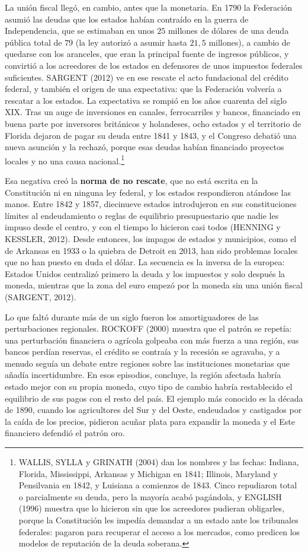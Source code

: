 \documentclass[10pt,a4paper]{article}
\begin{document}
La unión fiscal llegó, en cambio, antes que la monetaria. En 1790 la Federación asumió las deudas que los estados habían contraído en la guerra de Independencia, que se estimaban en unos $25$ millones de dólares de una deuda pública total de $79$ (la ley autorizó a asumir hasta $21{,}5$ millones), a cambio de quedarse con los aranceles, que eran la principal fuente de ingresos públicos, y convirtió a los acreedores de los estados en defensores de unos impuestos federales suficientes. SARGENT (2012) ve en ese rescate el acto fundacional del crédito federal, y también el origen de una expectativa: que la Federación volvería a rescatar a los estados. La expectativa se rompió en los años cuarenta del siglo XIX. Tras un auge de inversiones en canales, ferrocarriles y bancos, financiado en buena parte por inversores británicos y holandeses, ocho estados y el territorio de Florida dejaron de pagar su deuda entre 1841 y 1843, y el Congreso debatió una nueva asunción y la rechazó, porque esas deudas habían financiado proyectos locales y no una causa nacional.\footnote{%
    WALLIS, SYLLA y GRINATH (2004) dan los nombres y las fechas: Indiana, Florida, Mississippi, Arkansas y Michigan en 1841; Illinois, Maryland y Pensilvania en 1842, y Luisiana a comienzos de 1843. Cinco repudiaron total o parcialmente su deuda, pero la mayoría acabó pagándola, y ENGLISH (1996) muestra que lo hicieron sin que los acreedores pudieran obligarles, porque la Constitución les impedía demandar a un estado ante los tribunales federales: pagaron para recuperar el acceso a los mercados, como predicen los modelos de reputación de la deuda soberana.
}

Esa negativa creó la \textbf{norma de no rescate}, que no está escrita en la Constitución ni en ninguna ley federal, y los estados respondieron atándose las manos. Entre 1842 y 1857, diecinueve estados introdujeron en sus constituciones límites al endeudamiento o reglas de equilibrio presupuestario que nadie les impuso desde el centro, y con el tiempo lo hicieron casi todos (HENNING y KESSLER, 2012). Desde entonces, los impagos de estados y municipios, como el de Arkansas en 1933 o la quiebra de Detroit en 2013, han sido problemas locales que no han puesto en duda el dólar. La secuencia es la inversa de la europea: Estados Unidos centralizó primero la deuda y los impuestos y solo después la moneda, mientras que la zona del euro empezó por la moneda sin una unión fiscal (SARGENT, 2012).

Lo que faltó durante más de un siglo fueron los amortiguadores de las perturbaciones regionales. ROCKOFF (2000) muestra que el patrón se repetía: una perturbación financiera o agrícola golpeaba con más fuerza a una región, sus bancos perdían reservas, el crédito se contraía y la recesión se agravaba, y a menudo seguía un debate entre regiones sobre las instituciones monetarias que añadía incertidumbre. En esos episodios, concluye, la región afectada habría estado mejor con su propia moneda, cuyo tipo de cambio habría restablecido el equilibrio de sus pagos con el resto del país. El ejemplo más conocido es la década de 1890, cuando los agricultores del Sur y del Oeste, endeudados y castigados por la caída de los precios, pidieron acuñar plata para expandir la moneda y el Este financiero defendió el patrón oro.
\end{document}
